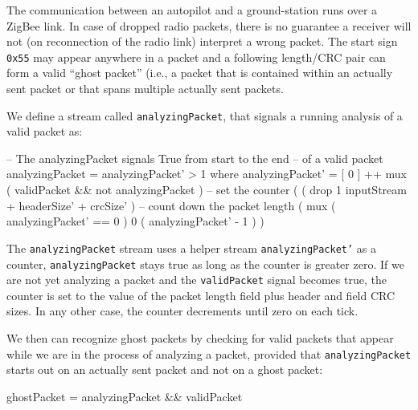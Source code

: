 The communication between an autopilot and a ground-station runs over
a ZigBee link. In case of dropped radio packets, there is no guarantee
a receiver will not (on reconnection of the radio link) interpret a
wrong packet. The start sign {\tt 0x55} may appear anywhere in a
packet and a following length/CRC pair can form a valid ``ghost
packet'' (i.e., a packet that is contained within an actually sent
packet or that spans multiple actually sent packets.

We define a stream called {\tt analyzingPacket}, that signals a running
analysis of a valid packet as:

\begin{code}
-- The analyzingPacket signals True from start to the end
-- of a valid packet
analyzingPacket = analyzingPacket' > 1
  where analyzingPacket' = [ 0 ] ++ mux
               ( validPacket && not analyzingPacket )
                -- set the counter
               ( ( drop 1 inputStream
                   + headerSize'
                   + crcSize' )
                 -- count down the packet length
                 ( mux ( analyzingPacket' == 0 )
                     0
                     ( analyzingPacket' - 1 ) )
\end{code}

The {\tt analyzingPacket} stream uses a helper stream {\tt analyzingPacket'}
as a counter, {\tt analyzingPacket} stays true as long as the counter is greater
zero. If we are not yet analyzing a packet and the {\tt validPacket}
signal becomes true, the counter is set to the value of the packet length
field plus header and field CRC sizes. In any other case, the counter
decrements until zero on each tick.

We then can recognize ghost packets by checking for valid packets that
appear while we are in the process of analyzing a packet, provided
that {\tt analyzingPacket} starts out on an actually sent packet and
not on a ghost packet:

\begin{code}
ghostPacket = analyzingPacket && validPacket
\end{code}


